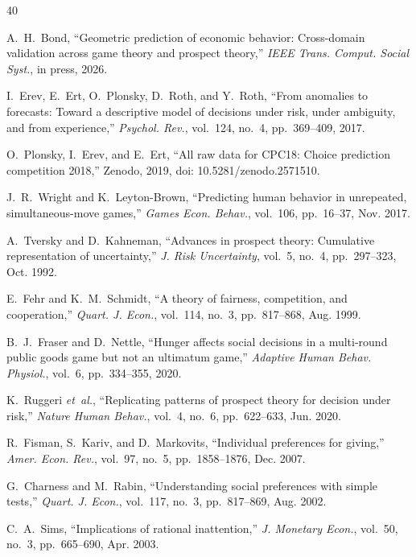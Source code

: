 \documentclass[journal]{IEEEtran}
\begin{document}
\begin{thebibliography}{40}

A.~H.~Bond, ``Geometric prediction of economic behavior: Cross-domain validation across game theory and prospect theory,''
\emph{IEEE Trans. Comput. Social Syst.}, in press, 2026.

I.~Erev, E.~Ert, O.~Plonsky, D.~Roth, and Y.~Roth, ``From anomalies to forecasts: Toward a descriptive model of decisions under risk, under ambiguity, and from experience,''
\emph{Psychol. Rev.}, vol.~124, no.~4, pp.~369--409, 2017.

O.~Plonsky, I.~Erev, and E.~Ert, ``All raw data for CPC18: Choice prediction competition 2018,''
Zenodo, 2019, doi: 10.5281/zenodo.2571510.

J.~R.~Wright and K.~Leyton-Brown, ``Predicting human behavior in unrepeated, simultaneous-move games,''
\emph{Games Econ. Behav.}, vol.~106, pp.~16--37, Nov. 2017.

A.~Tversky and D.~Kahneman, ``Advances in prospect theory: Cumulative representation of uncertainty,''
\emph{J. Risk Uncertainty}, vol.~5, no.~4, pp.~297--323, Oct. 1992.

E.~Fehr and K.~M.~Schmidt, ``A theory of fairness, competition, and cooperation,''
\emph{Quart. J. Econ.}, vol.~114, no.~3, pp.~817--868, Aug. 1999.

B.~J.~Fraser and D.~Nettle, ``Hunger affects social decisions in a multi-round public goods game but not an ultimatum game,''
\emph{Adaptive Human Behav. Physiol.}, vol.~6, pp.~334--355, 2020.

K.~Ruggeri \emph{et~al.}, ``Replicating patterns of prospect theory for decision under risk,''
\emph{Nature Human Behav.}, vol.~4, no.~6, pp.~622--633, Jun. 2020.

R.~Fisman, S.~Kariv, and D.~Markovits, ``Individual preferences for giving,''
\emph{Amer. Econ. Rev.}, vol.~97, no.~5, pp.~1858--1876, Dec. 2007.

G.~Charness and M.~Rabin, ``Understanding social preferences with simple tests,''
\emph{Quart. J. Econ.}, vol.~117, no.~3, pp.~817--869, Aug. 2002.

C.~A.~Sims, ``Implications of rational inattention,''
\emph{J. Monetary Econ.}, vol.~50, no.~3, pp.~665--690, Apr. 2003.


\end{thebibliography}
\end{document}

